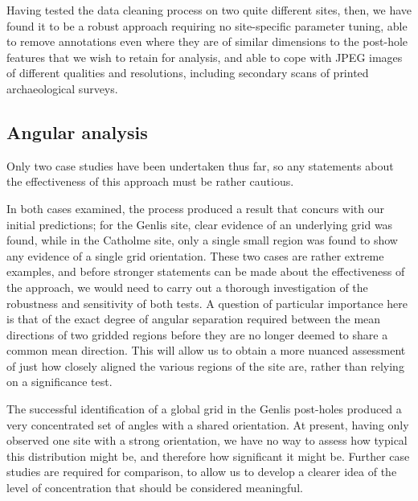 \documentclass[../../ArchStats.tex]{subfiles}
\begin{document}
Having tested the data cleaning process on two quite different sites, then, we have found it to be a robust approach requiring no site-specific parameter tuning, able to remove annotations even where they are of similar dimensions to the post-hole features that we wish to retain for analysis, and able to cope with JPEG images of different qualities and resolutions, including secondary scans of printed archaeological surveys. 

\subsection{Angular analysis}
Only two case studies have been undertaken thus far, so any statements about the effectiveness of this approach must be rather cautious. 

In both cases examined, the process produced a result that concurs with our initial predictions; for the Genlis site, clear evidence of an underlying grid was found, while in the Catholme site, only a single small region was found to show any evidence of a single grid orientation. These two cases are rather extreme examples, and before stronger statements can be made about the effectiveness of the approach, we would need to carry out a thorough investigation of the robustness and sensitivity of both tests. A question of particular importance here is that of the exact degree of angular separation required between the mean directions of two gridded regions before they are no longer deemed to share a common mean direction. This will allow us to obtain a more nuanced assessment of just how closely aligned the various regions of the site are, rather than relying on a significance test.

The successful identification of a global grid in the  Genlis post-holes produced a very concentrated set of angles with a shared orientation. At present, having only observed one site with a strong orientation, we have no way to assess how typical this distribution might be, and therefore how significant it might be. Further case studies are required for comparison, to allow us to develop a clearer idea of the level of concentration that should be considered meaningful.

\end{document}
